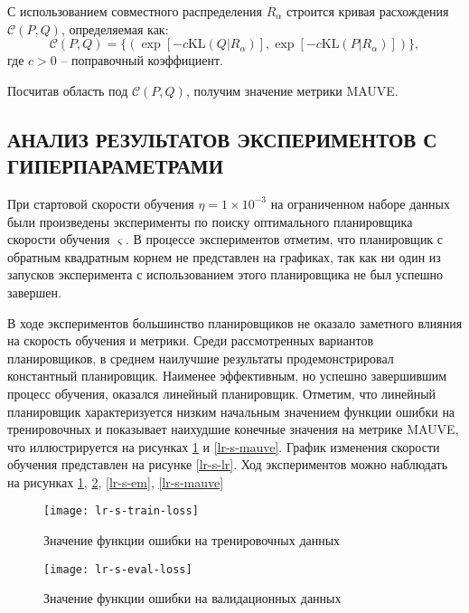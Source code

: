 С использованием совместного распределения $R_{\alpha}$ строится кривая расхождения $\mathcal{C}(P, Q)$, определяемая как:
\begin{equation}
  \mathcal{C}(P, Q) = \{\left(\exp[-c\text{KL}(Q \vert R_{\alpha})], \exp[-c\text{KL}(P \vert R_{\alpha})]\right)\},
\end{equation}где $c > 0$ -- поправочный коэффициент.

Посчитав область под $\mathcal{C}(P, Q)$, получим значение метрики MAUVE.

\subsection{АНАЛИЗ РЕЗУЛЬТАТОВ ЭКСПЕРИМЕНТОВ С ГИПЕРПАРАМЕТРАМИ}

При стартовой скорости обучения $\eta = 1 \times 10^{-3}$ на ограниченном наборе данных были произведены эксперименты по поиску оптимального планировщика скорости обучения $\varsigma$. В процессе экспериментов отметим, что планировщик с обратным квадратным корнем не представлен на графиках, так как ни один из запусков эксперимента с использованием этого планировщика не был успешно завершен.

В ходе экспериментов большинство планировщиков не оказало заметного влияния на скорость обучения и метрики. Среди рассмотренных вариантов планировщиков, в среднем наилучшие результаты продемонстрировал константный планировщик. Наименее эффективным, но успешно завершившим процесс обучения, оказался линейный планировщик. Отметим, что линейный планировщик характеризуется низким начальным значением функции ошибки на тренировочных и показывает наихудшие конечные значения на метрике MAUVE, что иллюстрируется на рисунках \ref{lr-s-train-loss} и \ref{lr-s-mauve}. График изменения скорости обучения представлен на рисунке \ref{lr-s-lr}. Ход экспериментов можно наблюдать на рисунках \ref{lr-s-train-loss}, \ref{lr-s-eval-loss}, \ref{lr-s-em}, \ref{lr-s-mauve}

\begin{figure}[H]
  \centering
  \texttt{[image: lr-s-train-loss]}
  \caption{Значение функции ошибки на тренировочных данных}
  \label{lr-s-train-loss}
\end{figure}

\begin{figure}[H]
  \centering
  \texttt{[image: lr-s-eval-loss]}
  \caption{Значение функции ошибки на валидационных данных}
  \label{lr-s-eval-loss}
\end{figure}

